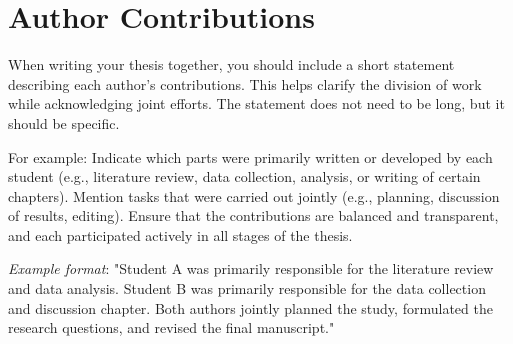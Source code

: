\chapter{Author Contributions} \label{cha:contributions}

When writing your thesis together, you should include a short statement describing each author’s contributions. This helps clarify the division of work while acknowledging joint efforts. The statement does not need to be long, but it should be specific. 

For example:
Indicate which parts were primarily written or developed by each student (e.g., literature review, data collection, analysis, or writing of certain chapters).
Mention tasks that were carried out jointly (e.g., planning, discussion of results, editing).
Ensure that the contributions are balanced and transparent, and each participated actively in all stages of the thesis. 
\bigskip

\textit{Example format}:
"Student A was primarily responsible for the literature review and data analysis. Student B was primarily responsible for the data collection and discussion chapter. Both authors jointly planned the study, formulated the research questions, and revised the final manuscript."